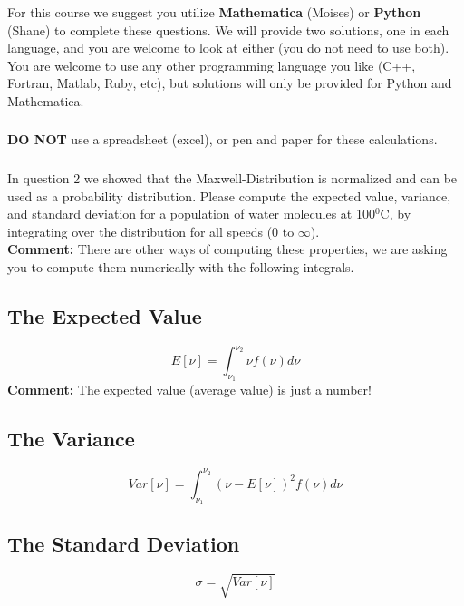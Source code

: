 \documentclass{article}
\newcommand{\be}{\begin{equation}}
\newcommand{\ee}{\end{equation}}
\begin{document}
For this course we suggest you utilize \textbf{Mathematica} (Moises) or \textbf{Python} (Shane) to complete these questions.
We will provide two solutions, one in each language, and you are welcome to look at either (you do not need to use both).
You are welcome to use any other programming language you like (C++, Fortran, Matlab, Ruby, etc), but solutions will only be provided for Python and Mathematica. 

\subsubsection*{}
\textbf{DO NOT} use a spreadsheet (excel), or pen and paper for these calculations. 

\subsubsection*{}
In question 2 we showed that the Maxwell-Distribution is normalized and can be used as a probability distribution.
Please compute the expected value, variance, and standard deviation for a population of water molecules at 100$^0$C,
by integrating over the distribution for all speeds (0 to $\infty$). \\
\textbf{Comment:} There are other ways of computing these properties, we are asking you to compute them numerically with the following integrals.

\subsection{The Expected Value} 
\be
E[\nu] = \int_{\nu_1}^{\nu_2} \nu f(\nu) d\nu 
\ee
\textbf{Comment:} The expected value (average value) is just a number!

\subsection{The Variance}
\be
Var[\nu] = \int_{\nu_1}^{\nu_2} \left(\nu-E[\nu]\right)^2 f(\nu) d\nu 
\ee

\subsection{The Standard Deviation}
\be
\sigma = \sqrt{Var[\nu]}
\ee
\end{document}
